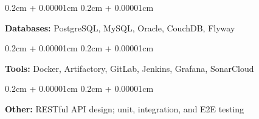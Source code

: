 \documentclass[11pt, letterpaper]{article}
\newenvironment{onecolentry}{
    \begin{adjustwidth}{
        0.2cm + 0.00001cm
    }{
        0.2cm + 0.00001cm
    }
}{
    \end{adjustwidth}
}
\begin{document}
    \begin{onecolentry}
        \textbf{Databases:} PostgreSQL, MySQL, Oracle, CouchDB, Flyway
    \end{onecolentry}
    
    \vspace{0.2cm}
    
    \begin{onecolentry}
        \textbf{Tools:} Docker, Artifactory, GitLab, Jenkins, Grafana, SonarCloud
    \end{onecolentry}
    
    \vspace{0.2cm}
    
    \begin{onecolentry}
        \textbf{Other:} RESTful API design; unit, integration, and E2E testing
    \end{onecolentry}
    
\end{document}

